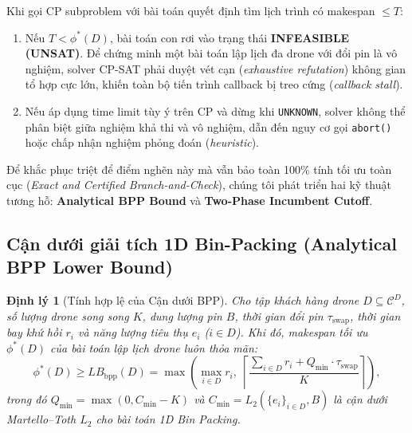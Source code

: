 \documentclass[12pt,a4paper]{article}
\newtheorem{theorem}{Định lý}
\newcommand{\CD}{\mathcal{C}^{D}}
\newcommand{\swap}{\tau_{\mathrm{swap}}}
\begin{document}
Khi gọi CP subproblem với bài toán quyết định tìm lịch trình có makespan $\le T$:
\begin{enumerate}[leftmargin=2em]
    \item Nếu $T < \phi^*(D)$, bài toán con rơi vào trạng thái \textbf{INFEASIBLE (UNSAT)}. Để chứng minh một bài toán lập lịch đa drone với đổi pin là vô nghiệm, solver CP-SAT phải duyệt vét cạn (\emph{exhaustive refutation}) không gian tổ hợp cực lớn, khiến toàn bộ tiến trình callback bị treo cứng (\emph{callback stall}).
    \item Nếu áp dụng time limit tùy ý trên CP và dừng khi \texttt{UNKNOWN}, solver không thể phân biệt giữa nghiệm khả thi và vô nghiệm, dẫn đến nguy cơ gọi \texttt{abort()} hoặc chấp nhận nghiệm phỏng đoán (\emph{heuristic}).
\end{enumerate}

Để khắc phục triệt để điểm nghẽn này mà vẫn bảo toàn 100\% tính tối ưu toàn cục (\emph{Exact and Certified Branch-and-Check}), chúng tôi phát triển hai kỹ thuật tương hỗ: \textbf{Analytical BPP Bound} và \textbf{Two-Phase Incumbent Cutoff}.

\subsection{Cận dưới giải tích 1D Bin-Packing (Analytical BPP Lower Bound)}

\begin{theorem}[Tính hợp lệ của Cận dưới BPP]
\label{thm:bpp-lb}
Cho tập khách hàng drone $D \subseteq \CD$, số lượng drone song song $K$, dung lượng pin $B$, thời gian đổi pin $\swap$, thời gian bay khứ hồi $r_i$ và năng lượng tiêu thụ $e_i$ ($i \in D$). Khi đó, makespan tối ưu $\phi^*(D)$ của bài toán lập lịch drone luôn thỏa mãn:
\begin{equation}
    \phi^*(D) \ge LB_{\mathrm{bpp}}(D) = \max\left( \max_{i \in D} r_i, \; \left\lceil \frac{\sum_{i \in D} r_i + Q_{\min} \cdot \swap}{K} \right\rceil \right),
    \label{eq:bpp-lb-formula}
\end{equation}
trong đó $Q_{\min} = \max(0, C_{\min} - K)$ và $C_{\min} = L_2(\{e_i\}_{i \in D}, B)$ là cận dưới Martello--Toth $L_2$ cho bài toán 1D Bin Packing.
\end{theorem}
\end{document}
